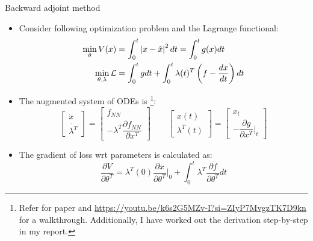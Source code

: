 \documentclass[dvipsnames, 9pt]{beamer}
\begin{document}
\begin{frame}{Backward adjoint method}
    \begin{itemize}
        \item Consider following optimization problem and the Lagrange functional:
        \begin{align*}
            \min\limits_{\theta}V(x) &= \int_0^t \left| x - \hat{x} \right|^2 dt = \int_0^t g(x)dt \notag \\
            \min\limits_{\theta, \lambda}\mathcal{L} &= \int_0^t g dt + \int_0^t \lambda(t)^T \left(f - \dfrac{dx}{dt}\right) dt
        \end{align*}
        \item The augmented system of ODEs is \footnote{Refer \cite{sengupta:friston:penny:2014} for paper and 
        \url{https://youtu.be/k6s2G5MZv-I?si=ZIyP7MvgzTK7D9kn} for a walkthrough. Additionally, 
        I have worked out the derivation step-by-step in my report.}:
        \[
        \begin{bmatrix} \dot{x} \\ \dot{\lambda^T} \end{bmatrix} = 
        \begin{bmatrix} f_{NN} \\ -\lambda^T \dfrac{\partial f_{NN}}{\partial x^T}\end{bmatrix}
        \qquad
        \begin{bmatrix} x(t) \\ \lambda^T(t) \end{bmatrix} =
        \begin{bmatrix} x_t \\ - \dfrac{\partial g}{\partial x^T}|_{t} \end{bmatrix}
        \label{eq:augsens}
        \]
        \item The gradient of loss wrt parameters is calculated as:
        \[
            \dfrac{\partial V}{\partial \theta^T} = \lambda^T(0)\dfrac{\partial x}{\partial \theta^T}|_0 + \int_0^t   \lambda^T \dfrac{\partial f}{\partial \theta^T} dt
        \]
    \end{itemize}
\end{frame}
\end{document}
